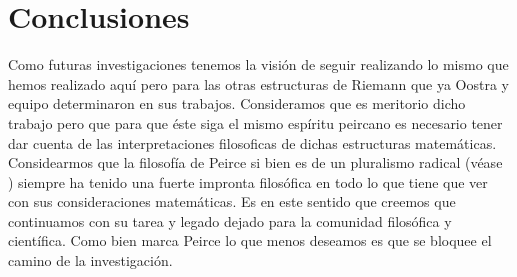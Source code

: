 \documentclass[
	fontsize=10pt, %
	twoside=false, %
	secnumdepth=1, %
	abstract=true, %
]{kaohandt}
\begin{document}

\section{Conclusiones} %
\label{sec:Conclusiones}

Como futuras investigaciones tenemos la visión de seguir realizando lo mismo que hemos realizado aquí pero para las otras estructuras de Riemann que ya Oostra y equipo determinaron en sus trabajos. Consideramos que es meritorio dicho trabajo pero que para que éste siga el mismo espíritu peircano es necesario tener dar cuenta de las interpretaciones filosoficas de dichas estructuras matemáticas. Considearmos que la filosofía de Peirce si bien es de un pluralismo radical (véase ) siempre ha tenido una fuerte impronta filosófica en todo lo que tiene que ver con sus consideraciones matemáticas. Es en este sentido que creemos que continuamos con su tarea y legado dejado para la comunidad filosófica y científica. Como bien marca Peirce lo que menos deseamos es que se bloquee el camino de la investigación.


%
%



\printbibliography[title=Bibliografía] %
\nocite{peirce1931, robin1971}
\end{document}

